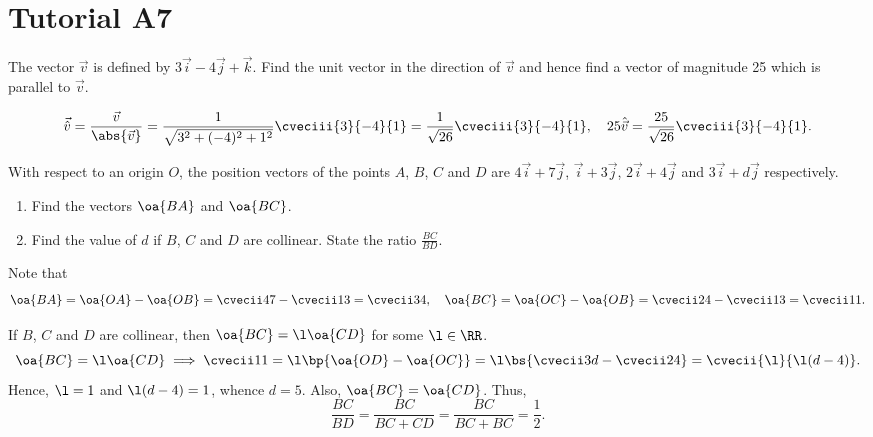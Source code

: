 \section{Tutorial A7}

\begin{problem}
    The vector $\vec v$ is defined by $3\vec i - 4 \vec j + \vec k$. Find the unit vector in the direction of $\vec v$ and hence find a vector of magnitude 25 which is parallel to $\vec v$.
\end{problem}
\begin{solution}
    \[\vec{\hat v} = \frac{\vec v}{\abs{\vec v}} = \frac{1}{\sqrt{3^2 + (-4)^2 + 1^2}} \cveciii{3}{-4}{1} = \frac{1}{\sqrt{26}} \cveciii{3}{-4}{1}, \quad 25 \hat{\vec v} = \frac{25}{\sqrt{26}} \cveciii{3}{-4}{1}.\]
\end{solution}

\begin{problem}
    With respect to an origin $O$, the position vectors of the points $A$, $B$, $C$ and $D$ are $4\vec i + 7 \vec j$, $\vec i + 3 \vec j$, $2\vec i + 4 \vec j$ and $3\vec i + d\vec j$ respectively.

    \begin{enumerate}
        \item Find the vectors $\oa{BA}$ and $\oa{BC}$.
        \item Find the value of $d$ if $B$, $C$ and $D$ are collinear. State the ratio $\frac{BC}{BD}$.
    \end{enumerate}
\end{problem}
\begin{solution}
    \begin{ppart}
        Note that \[\oa{BA} = \oa{OA} - \oa{OB} = \cvecii47 - \cvecii13 = \cvecii34, \quad \oa{BC} = \oa{OC} - \oa{OB} = \cvecii24 - \cvecii13 = \cvecii11.\]
    \end{ppart}
    \begin{ppart}
        If $B$, $C$ and $D$ are collinear, then $\oa{BC} = \l \oa{CD}$ for some $\l \in \RR$. \[\oa{BC} = \l \oa{CD} \implies \cvecii11 = \l\bp{\oa{OD} - \oa{OC}} = \l\bs{\cvecii3d - \cvecii24} = \cvecii{\l}{\l(d-4)}.\] Hence, $\l = 1$ and $\l(d - 4) = 1$, whence $d = 5$. Also, $\oa{BC} = \oa{CD}$. Thus, \[\frac{BC}{BD} = \frac{BC}{BC + CD} = \frac{BC}{BC + BC} = \frac12.\]
    \end{ppart}
\end{solution}

